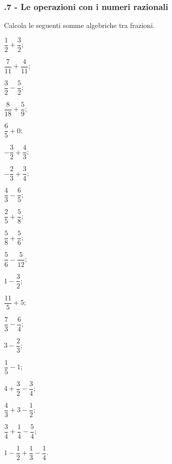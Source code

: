 
\subsubsection*{\thechapter.7 - Le operazioni con i numeri razionali}


\begin{esercizio}[\Ast]
 \label{ese:3.46}
Calcola le seguenti somme algebriche tra frazioni.
\begin{multicols}{4}
\begin{enumeratea}
\spazielenx
\item $\dfrac{1}{2} + \dfrac{3}{2}$;
\item $\dfrac{7}{11} + \dfrac{4}{11}$;
\item $\dfrac{3}{2} - \dfrac{5}{2}$;
\item $\dfrac{8}{18} + \dfrac{5}{9}$;
\item $\dfrac{6}{5} + 0$;
\item $-\dfrac{3}{2}+\dfrac{4}{3}$;
\item $-\dfrac{2}{3}+\dfrac{3}{4}$;
\item $\dfrac{4}{3}-\dfrac{6}{5}$;
\item $\dfrac{2}{5}+\dfrac{5}{8}$;
\item $\dfrac{5}{8}+\dfrac{5}{6}$;
\item $\dfrac{5}{6}-\dfrac{5}{12}$;
\item $1-\dfrac{3}{2}$;
\item $\dfrac{11}{5}+5$;
\item $\dfrac{7}{3}-\dfrac{6}{4}$;
\item $3-\dfrac{2}{3}$;
\item $\dfrac{1}{5}-1$;
\item $4+\dfrac{3}{2}-\dfrac{3}{4}$;
\item $\dfrac{4}{3}+3-\dfrac{1}{2}$;
\item $\dfrac{3}{4}+\dfrac{1}{4}-\dfrac{5}{4}$;
\item $1-\dfrac{1}{2}+\dfrac{1}{3}-\dfrac{1}{4}$.
\end{enumeratea}
\end{multicols}
\end{esercizio}

